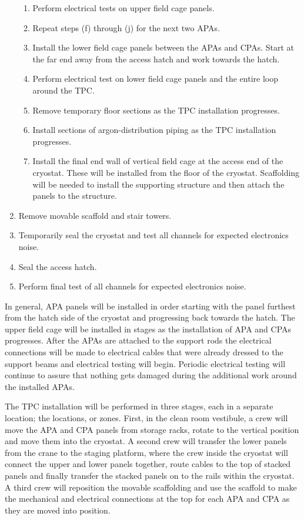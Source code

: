 \begin{enumerate}
\begin{enumerate}
   \item Perform electrical tests on upper field cage panels.
   \item Repeat steps (f) through (j) for the next two APAs.
   \item Install the lower field cage panels between the APAs and CPAs.  Start at the far end away from the access hatch and work towards the hatch. 
   \item Perform electrical test on lower field cage panels and the entire loop around the TPC.
   \item Remove temporary floor sections as the TPC installation progresses.
   \item Install sections of argon-distribution piping as the TPC installation progresses.
   \item Install the final end wall of vertical field cage at the access end of the cryostat.  These will be installed from the floor of the cryostat.  Scaffolding will be needed to install the supporting structure and then attach the panels to the structure.
   \end{enumerate}
\item Remove movable scaffold and stair towers.
\item Temporarily seal the cryostat and test all channels for expected electronics noise.
\item Seal the access hatch.
\item Perform final test of all channels for expected electronics noise.
\end{enumerate}
 
In general, APA panels will be installed in order starting with the panel furthest from the hatch side of the cryostat and progressing back towards the hatch. The upper field cage will be installed in stages as the installation of APA and CPAs progresses.  After the APAs are attached to the support rods the electrical connections will be made to electrical cables that were already dressed to the support beams and electrical testing will begin. Periodic electrical testing will continue to assure that nothing gets  damaged during the additional work around the installed APAs.  

The TPC installation will be performed in three stages, each in a separate location; the locations, or 
zones. First, in the clean room vestibule, a crew will move the APA and CPA panels from storage racks, rotate to the vertical position and move them into the cryostat. %
A second crew will transfer the lower panels from the crane to the staging platform, where the crew inside the cryostat will connect the upper and lower panels together, route cables to the top of stacked panels and finally transfer the stacked panels on to the rails within the cryostat. A third crew will reposition the movable scaffolding and use the scaffold to make the mechanical and electrical  connections at the top for each APA and CPA as they are moved into position.  

